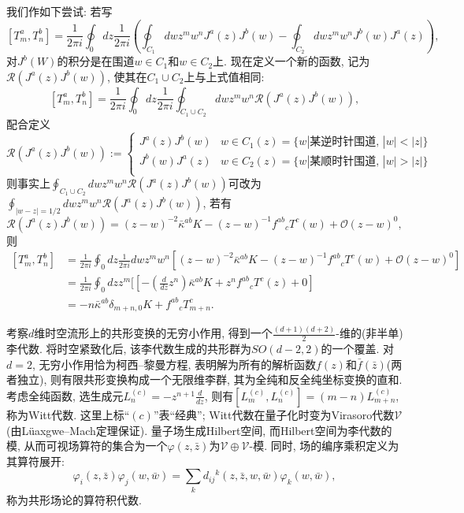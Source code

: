 \documentclass{ctexart}%
\theoremstyle{definition}
\theoremstyle{remark}
\begin{document}
我们作如下尝试: 若写
$$[T^a_m,T^b_n]=\frac{1}{2\pi i}\oint_0 dz \frac{1}{2\pi i}\left(
\oint_{C_1} dw z^m w^n J^a(z)J^b(w)-\oint_{C_2} dw z^m w^n J^b(w) J^a(z)\right),$$
对$J^b(W)$的积分是在围道$w\in C_1$和$w\in C_2$上. 现在定义一个新的函数, 记为$\mathcal{R}(J^a(z)J^b(w))$, 使其在$C_1\cup C_2$上与上式值相同:
$$[T^a_m,T^b_n] = \frac{1}{2\pi i}\oint_0 dz \frac{1}{2\pi i} \oint_{C_1\cup C_2} dw z^m w^n \mathcal{R}(J^a(z)J^b(w)),$$
配合定义
$$
\mathcal{R}(J^a(z)J^b(w))
:=\left\{\begin{array}{cc}
J^a(z)J^b(w)& w\in C_1(z) = \{w|\text{某逆时针围道, }|w|< |z|\}\\
J^b(w)J^a(z)& w\in C_2(z) = \{w|\text{某顺时针围道, }|w|> |z|\}\\
\end{array}\right.
$$
则事实上$\oint_{C_1\cup C_2} dw z^m w^n \mathcal{R}(J^a(z)J^b(w))$可改为
$\oint_{|w-z|=1/2} dw z^m w^n \mathcal{R}(J^a(z)J^b(w))$, 若有
$$\mathcal{R}(J^a(z)J^b(w))
=(z-w)^{-2}\bar{\kappa}^{ab}K-(z-w)^{-1} f^{ab}{}_c T^c(w)+\mathcal{O}(z-w)^0,$$
则
\begin{equation}
\begin{aligned}
{}[T^a_m,T^b_n] &= \frac{1}{2\pi i} \oint_0 dz \frac{1}{2\pi i} dw z^m w^n
[(z-w)^{-2}\bar{\kappa}^{ab}K-(z-w)^{-1} f^{ab}{}_c T^c(w)+\mathcal{O}(z-w)^0]\\
&= \frac{1}{2\pi i} \oint_0 dz z^m[[-(\frac{d}{dz}z^n)\bar{\kappa}^{ab} K + z^n f^{ab}{}_c T^c(z)+0]\\
&=-n\bar{\kappa}^{ab} \delta_{m+n,0}K + f^{ab}{}_c T^c_{m+n}.
\end{aligned}
\end{equation}


考察$d$维时空流形上的共形变换的无穷小作用, 得到一个$\frac{(d+1)(d+2)}{2}$-维的(非半单)李代数. 将时空紧致化后, 该李代数生成的共形群为$SO(d-2,2)$的一个覆盖. 对$d=2$, 无穷小作用恰为柯西--黎曼方程, 表明解为所有的解析函数$f(z)$和$\bar{f}(\bar{z})$(两者独立), 则有限共形变换构成一个无限维李群, 其为全纯和反全纯坐标变换的直和. 考虑全纯函数, 选生成元$L^{(c)}_n = - z^{n+1}\frac{d}{dz}$, 则有$[L^{(c)}_m,L^{(c)}_n] = (m-n) L^{(c)}_{m+n}$,称为Witt代数. 这里上标``$(c)$''表``经典''; Witt代数在量子化时变为Virasoro代数$\mathcal{V}$(由L\"{u}axgwe--Mach定理保证). 量子场生成Hilbert空间, 而Hilbert空间为李代数的模, 从而可视场算符的集合为一个$\varphi(z,\bar{z})$为$\mathcal{V}\oplus \mathcal{V}$-模. 同时, 场的编序乘积定义为其算符展开:
$$\varphi_i(z,\bar{z})\varphi_j(w,\bar{w})=\sum_k d_{ij}{}^k(z,\bar{z},w,\bar{w})\varphi_k(w,\bar{w}),$$
称为共形场论的算符积代数.
\end{document}
